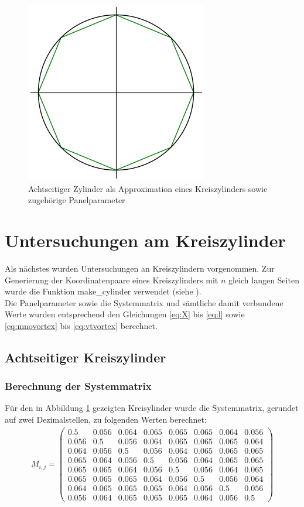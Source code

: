 \begin{figure}[!h]
\begin{center}
\includegraphics[scale=0.7]{figures/cylinderascircle.png} 
\caption{Achtseitiger Zylinder als Approximation eines Kreiszylinders sowie zugehörige Panelparameter}
\label{fig:cylinder8}
\end{center}
\end{figure}
\section{Untersuchungen am  Kreiszylinder}

Als nächstes wurden Untersuchungen an Kreiszylindern vorgenommen. Zur Generierung der Koordinatenpaare eines Kreiszylinders mit $n$ gleich langen Seiten wurde die Funktion make\_cylinder verwendet (siehe ). \\
Die Panelparameter sowie die Systemmatrix und sämtliche damit verbundene Werte wurden entsprechend den Gleichungen \eqref{eq:X} bis \eqref{eq:l} sowie \eqref{eq:mnovortex} bis \eqref{eq:vtvortex} berechnet. 

\subsection{Achtseitiger Kreiszylinder}
\subsubsection{Berechnung der Systemmatrix}
Für den in Abbildung \ref{fig:cylinder8} gezeigten Kreisylinder wurde die Systemmatrix, gerundet auf zwei Dezimalstellen, zu folgenden Werten berechnet:
\begin{align*}
M_{i,j} = 
\begin{pmatrix}
0.5&0.056&0.064&0.065&0.065&0.065&0.064&0.056 \\
0.056&0.5&0.056&0.064&0.065&0.065&0.065&0.064\\
0.064&0.056&0.5&0.056&0.064&0.065&0.065&0.065\\
0.065&0.064&0.056&0.5&0.056&0.064&0.065&0.065\\
0.065&0.065&0.064&0.056&0.5&0.056&0.064&0.065\\
0.065&0.065&0.065&0.064&0.056&0.5&0.056&0.064\\
0.064&0.065&0.065&0.065&0.064&0.056&0.5&0.056\\
0.056&0.064&0.065&0.065&0.065&0.064&0.056&0.5
\end{pmatrix}
\end{align*}
